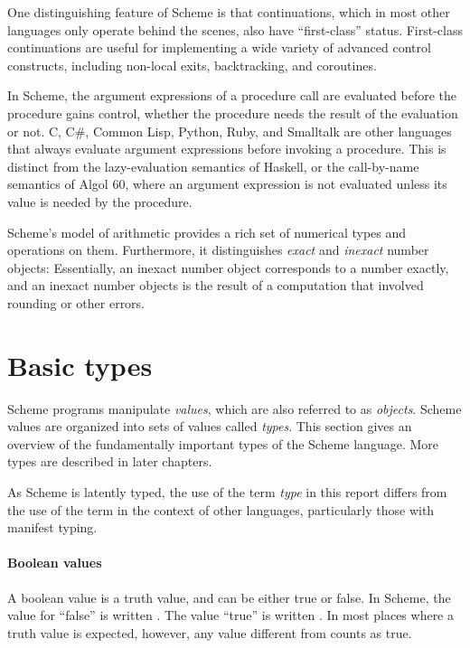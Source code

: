 \vest One distinguishing feature of Scheme is that continuations, which
in most other languages only operate behind the scenes, also have
``first-class'' status.  First-class continuations are useful for implementing a
wide variety of advanced control constructs, including non-local exits,
backtracking, and coroutines.

In Scheme, the argument expressions of a procedure call are evaluated
before the procedure gains control, whether the procedure needs the
result of the evaluation or not.  C, C\#, Common Lisp, Python,
Ruby, and Smalltalk are other languages that always evaluate argument
expressions before invoking a procedure.  This is distinct from the
lazy-evaluation semantics of Haskell, or the call-by-name semantics of
Algol 60, where an argument expression is not evaluated unless its
value is needed by the procedure.

Scheme's model of arithmetic provides a rich set of numerical types
and operations on them.  Furthermore, it distinguishes \textit{exact}
and \textit{inexact} number objects: Essentially, an inexact number
object corresponds to a number exactly, and an inexact number objects
is the result of a computation that involved rounding or other errors.

\section{Basic types}

Scheme programs manipulate \textit{values}, which are also referred
to as \textit{objects}.
Scheme values are organized into sets of values called \textit{types}.
This section gives an overview of the fundamentally important types of the
Scheme language.  More types are described in later chapters.

\begin{note}
  As Scheme is latently typed, the use of the term \textit{type} in
  this report differs from the use of the term in the context of other
  languages, particularly those with manifest typing.
\end{note}

\paragraph{Boolean values}

A boolean value is a truth value, and can be either
true or false.  In Scheme, the value for ``false'' is written
\schfalse{}.  The value ``true'' is written \schtrue{}.  In
most places where a truth value is expected, however, any value different from
\schfalse{} counts as true.

